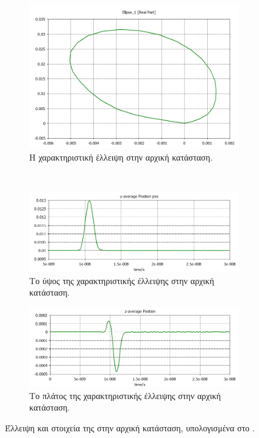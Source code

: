 \begin{figure}[tph]	
\centering
	\begin{subfigure}{0.7\textwidth}
		\includegraphics[width=\linewidth]{figures/CST-variable-analysis/CST-initial-ellipse}
		\centering
		\caption{Η χαρακτηριστική έλλειψη στην αρχική κατάσταση.}
		\label{fig:CST-variable-analysis-initial-ellipse}
	\end{subfigure}
	~
	\begin{subfigure}{0.47\textwidth}
		\includegraphics[width=\linewidth]{figures/CST-variable-analysis/CST-initial-ellipse-height}
		\centering
		\caption{Το ύψος της χαρακτηριστικής έλλειψης στην αρχική κατάσταση.}
		\label{fig:CST-variable-analysis-initial-ellipse-height}
	\end{subfigure}
	\hfill
	\begin{subfigure}{0.47\textwidth}
		\includegraphics[width=\linewidth]{figures/CST-variable-analysis/CST-initial-ellipse-width}
		\centering
		\caption{Το πλάτος της χαρακτηριστικής έλλειψης στην αρχική κατάσταση.}
		\label{fig:CST-variable-analysis-initial-ellipse-width}
	\end{subfigure}	
\caption{Έλλειψη και στοιχεία της στην αρχική κατάσταση, υπολογισμένα στο .}
\label{fig:CST-initial-ellipse}
\end{figure}

